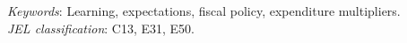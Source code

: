 \documentclass[12pt]{article}
\begin{document}
\begin{titlepage}
\begin{singlespace}
\noindent \textit{Keywords}: Learning, expectations, fiscal policy, expenditure multipliers. \\
\noindent \textit{JEL classification}: C13, E31, E50.
\end{singlespace}
\end{titlepage}
\end{document}

